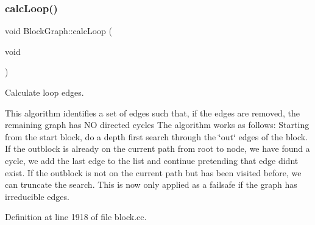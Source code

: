 \subsubsection{\texorpdfstring{calcLoop()}{calcLoop()}}
{\footnotesize\ttfamily void Block\+Graph\+::calc\+Loop (\begin{DoxyParamCaption}\item[{void}]{ }\end{DoxyParamCaption})}



Calculate loop edges. 

This algorithm identifies a set of edges such that, if the edges are removed, the remaining graph has NO directed cycles The algorithm works as follows\+: Starting from the start block, do a depth first search through the \char`\"{}out\char`\"{} edges of the block. If the outblock is already on the current path from root to node, we have found a cycle, we add the last edge to the list and continue pretending that edge didn\textquotesingle{}t exist. If the outblock is not on the current path but has been visited before, we can truncate the search. This is now only applied as a failsafe if the graph has irreducible edges. 

Definition at line 1918 of file block.\+cc.

